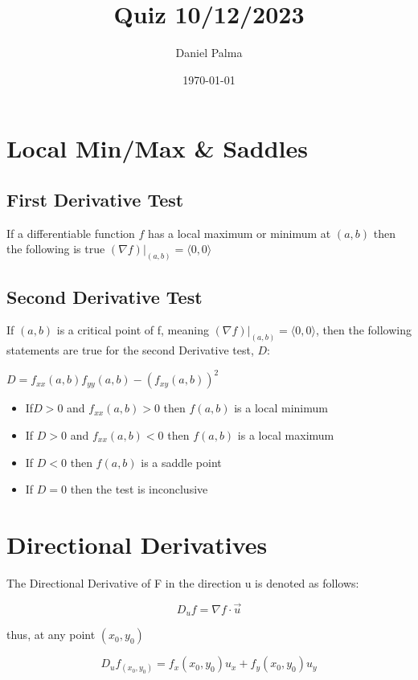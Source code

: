 \documentclass{article}
\author{Daniel Palma}
\date{\today}
\title{Quiz 10/12/2023}
\begin{document}
\maketitle
\newpage

\tableofcontents
\newpage

\section{Local Min/Max \& Saddles}

\subsection{First Derivative Test}


If a differentiable function $f$ has a local maximum or minimum at $(a,b)$ then the following is true $(\nabla f) \bigg\rvert_{(a,b)} = \langle 0,0 \rangle$


\subsection{Second Derivative Test}

If $(a,b)$ is a critical point of f, meaning $(\nabla f) \bigg\rvert_{(a,b)} = \langle 0,0 \rangle$, then the following statements are true for the second Derivative test, $D$:

$D = f_{xx}(a,b)f_{yy}(a,b) - (f_{xy}(a,b))^2$

\begin{itemize}
    \item If$ D > 0$ and $f_{xx}(a,b) > 0$ then $f(a,b)$ is a local minimum
    \item If $D > 0$ and $f_{xx}(a,b) < 0 $ then $f(a,b)$ is a local maximum
    \item If $D < 0$ then $f(a,b)$ is a saddle point
    \item If $D = 0$ then the test is inconclusive
\end{itemize}

\section{Directional Derivatives}

The Directional Derivative of F in the direction u is denoted as follows:

$$D_uf = \nabla f \cdot \vec{u}$$

thus, at any point $(x_0, y_0)$

$$D_uf_{(x_0, y_0)} = f_x(x_0, y_0)u_x + f_y(x_0, y_0)u_y$$
\end{document}
